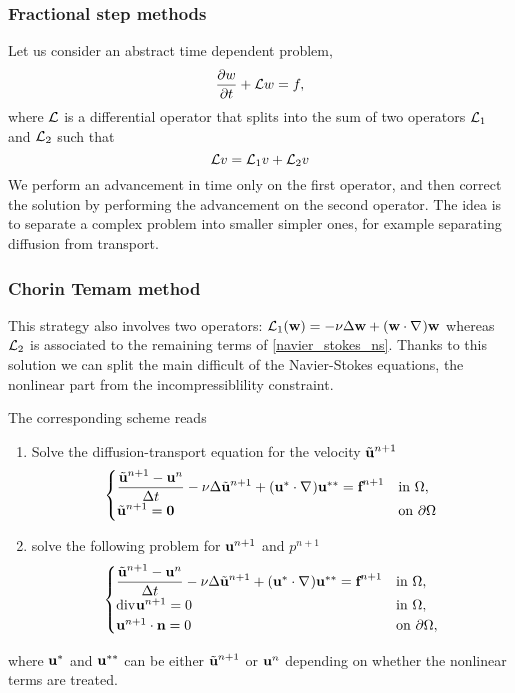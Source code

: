 \subsubsection*{Fractional step methods}
Let us consider an abstract time dependent problem,
\[
    \partialderivative{w}{t} + \loperator w = f,
\]
where \(\mathcal{L}\) is a differential operator that splits into the sum of two operators \(\mathcal{L}_1\) and \(\mathcal{L}_2\) such that
\[
    \mathcal{L} v = \mathcal{L}_1 v + \mathcal{L}_2 v
\]
We perform an advancement in time only on the first operator, and then correct the solution by performing the advancement on the second operator. The idea is to separate a complex problem into smaller simpler ones, for example separating diffusion from transport.
\subsubsection{Chorin Temam method}
This strategy also involves two operators: \(\mathcal{L}_1(\textbf{w}) = -\nu\Delta \textbf{w} + (\textbf{w} \cdot \nabla\mspace{1mu})\textbf{w}\) whereas \(\mathcal{L}_2\) is associated to the remaining terms of \eqref{navier_stokes_ns}. Thanks to this solution we can split the main difficult of the Navier-Stokes equations, the nonlinear part from the incompressiblility constraint.

The corresponding scheme reads 
\begin{enumerate}
    \item Solve the diffusion-transport equation for the velocity \(\tilde{\textbf{u}}^{n+1}\)
    \begin{equation}
        \begin{cases}
            \dfrac{\tilde{\textbf{u}}^{n+1}-\textbf{u}^n}{\Delta t} -\nu\Delta \tilde{\textbf{u}}^{n+1} + (\textbf{u}^* \cdot \nabla\mspace{1mu})\textbf{u}^{**} = \textbf{f}^{n+1} & \text{in }\Omega, \\
            \tilde{\textbf{u}}^{n+1} = \textbf{0} & \text{on }{\partial\Omega}
        \end{cases}
        \label{63_slide_ns}
    \end{equation}
    \item solve the following problem for \(\textbf{u}^{n+1}\) and \(p^{n+1}\)
    \begin{equation}
        \begin{cases}
            \dfrac{\tilde{\textbf{u}}^{n+1}-\textbf{u}^n}{\Delta t} -\nu \Delta \tilde{\textbf{u}}^{n+1} + (\textbf{u}^* \cdot \nabla\mspace{1mu})\textbf{u}^{**} = \textbf{f}^{n+1} & \text{in }\Omega, \\
            \text{div}\mspace{1mu} \textbf{u}^{n+1} = 0 & \text{in } \Omega, \\
            \textbf{u}^{n+1} \cdot \textbf{n} = 0 & \text{on }{\partial\Omega},
        \end{cases}
        \label{64_slide_ns}
    \end{equation}
\end{enumerate}
where \(\textbf{u}^*\) and \(\textbf{u}^{**}\) can be either \(\tilde{\textbf{u}}^{n+1}\) or \(\textbf{u}^n\) depending on whether the nonlinear terms are treated.

